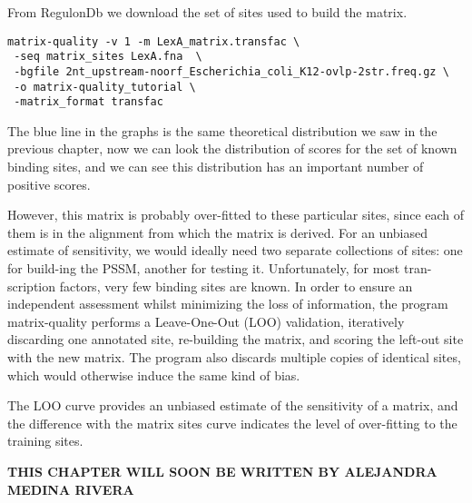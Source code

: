 From RegulonDb we download the set of sites used to build the matrix.

{\color{Blue} \begin{footnotesize}
\begin{verbatim}
matrix-quality -v 1 -m LexA_matrix.transfac \
 -seq matrix_sites LexA.fna  \
 -bgfile 2nt_upstream-noorf_Escherichia_coli_K12-ovlp-2str.freq.gz \
 -o matrix-quality_tutorial \
 -matrix_format transfac  

\end{verbatim} \end{footnotesize} }

The blue line in the graphs is the same theoretical distribution we
saw in the previous chapter, now we can look the distribution of
scores for the set of known binding sites, and we can see this
distribution has an important number of positive scores.

However, this matrix is probably over-fitted to these particular
sites, since each of them is in the alignment from which the matrix is
derived. For an unbiased estimate of sensitivity, we would ideally
need two separate collections of sites: one for build-ing the PSSM,
another for testing it. Unfortunately, for most tran-scription
factors, very few binding sites are known. In order to ensure an
independent assessment whilst minimizing the loss of information, the
program matrix-quality performs a Leave-One-Out (LOO) validation,
iteratively discarding one annotated site, re-building the matrix, and
scoring the left-out site with the new matrix. The program also
discards multiple copies of identical sites, which would otherwise
induce the same kind of bias.

The LOO curve provides an unbiased estimate
of the sensitivity of a matrix, and the difference with the matrix
sites curve indicates the level of over-fitting to the
training sites.  

















\textbf{THIS CHAPTER WILL SOON BE WRITTEN BY ALEJANDRA MEDINA RIVERA}
